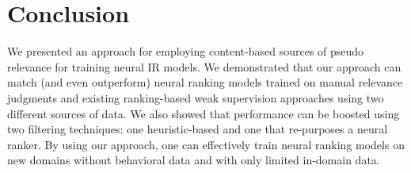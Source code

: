 \section{Conclusion} 
\label{sec.conclusion}

We presented an approach for employing content-based sources of pseudo relevance for training neural IR models. We demonstrated that our approach can match (and even outperform) neural ranking models trained on manual relevance judgments and existing ranking-based weak supervision approaches using two different sources of data. We also showed that performance can be boosted using two filtering techniques: one heuristic-based and one that re-purposes a neural ranker. By using our approach, one can effectively train neural ranking models on new domains without behavioral data and with only limited in-domain data.



